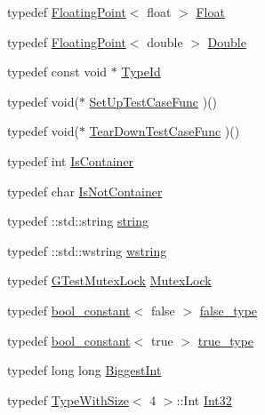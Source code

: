 \begin{DoxyCompactItemize}
\item 
typedef \hyperlink{classtesting_1_1internal_1_1_floating_point}{Floating\+Point}$<$ float $>$ \hyperlink{namespacetesting_1_1internal_a02e1981f5ff70609e6ac06e006ff519a}{Float}
\item 
typedef \hyperlink{classtesting_1_1internal_1_1_floating_point}{Floating\+Point}$<$ double $>$ \hyperlink{namespacetesting_1_1internal_a66a7579b1893b260c31dad577f7a5c48}{Double}
\item 
typedef const void $\ast$ \hyperlink{namespacetesting_1_1internal_ab1114197d3c657d8b7f8e0c5caa12d00}{Type\+Id}
\item 
typedef void($\ast$ \hyperlink{namespacetesting_1_1internal_ada14d66b5460b20e09071f51b9885c8d}{Set\+Up\+Test\+Case\+Func} )()
\item 
typedef void($\ast$ \hyperlink{namespacetesting_1_1internal_aad40244621b68546f3b830696225bf9b}{Tear\+Down\+Test\+Case\+Func} )()
\item 
typedef int \hyperlink{namespacetesting_1_1internal_ad8f0c2883245f1df2a53618a49f0deb3}{Is\+Container}
\item 
typedef char \hyperlink{namespacetesting_1_1internal_abf080521ce135deb510e0a7830fd3d33}{Is\+Not\+Container}
\item 
typedef \+::std\+::string \hyperlink{namespacetesting_1_1internal_a8e8ff5b11e64078831112677156cb111}{string}
\item 
typedef \+::std\+::wstring \hyperlink{namespacetesting_1_1internal_a3f543179329c353aee1d7b54a9a8e335}{wstring}
\item 
typedef \hyperlink{classtesting_1_1internal_1_1_g_test_mutex_lock}{G\+Test\+Mutex\+Lock} \hyperlink{namespacetesting_1_1internal_a08b187c6cc4e28400aadf9a32fccc8de}{Mutex\+Lock}
\item 
typedef \hyperlink{structtesting_1_1internal_1_1bool__constant}{bool\+\_\+constant}$<$ false $>$ \hyperlink{namespacetesting_1_1internal_abb1d0789f19bdde21affccbd1078b525}{false\+\_\+type}
\item 
typedef \hyperlink{structtesting_1_1internal_1_1bool__constant}{bool\+\_\+constant}$<$ true $>$ \hyperlink{namespacetesting_1_1internal_a62f917c3424d8841de9b49b5ec28edb4}{true\+\_\+type}
\item 
typedef long long \hyperlink{namespacetesting_1_1internal_a05c6bd9ede5ccdf25191a590d610dcc6}{Biggest\+Int}
\item 
typedef \hyperlink{classtesting_1_1internal_1_1_type_with_size}{Type\+With\+Size}$<$ 4 $>$\+::Int \hyperlink{namespacetesting_1_1internal_a8ee38faaf875f133358abaf9bc056cec}{Int32}

\end{DoxyCompactItemize}
